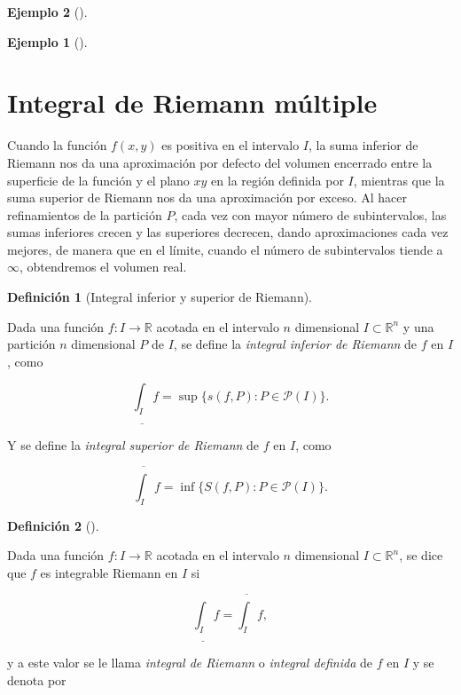 \documentclass[
  a4paper,
]{scrreport}
\theoremstyle{definition}
\newtheorem{example}{Ejemplo}[chapter]
\theoremstyle{plain}
\theoremstyle{definition}
\newtheorem{definition}{Definición}[chapter]
\theoremstyle{definition}
\theoremstyle{plain}
\theoremstyle{plain}
\theoremstyle{remark}
\begin{document}
\begin{example}[]
\begin{example}[]
\end{example}

\section{Integral de Riemann
múltiple}\label{integral-de-riemann-muxfaltiple}

Cuando la función \(f(x,y)\) es positiva en el intervalo \(I\), la suma
inferior de Riemann nos da una aproximación por defecto del volumen
encerrado entre la superficie de la función y el plano \(xy\) en la
región definida por \(I\), mientras que la suma superior de Riemann nos
da una aproximación por exceso. Al hacer refinamientos de la partición
\(P\), cada vez con mayor número de subintervalos, las sumas inferiores
crecen y las superiores decrecen, dando aproximaciones cada vez mejores,
de manera que en el límite, cuando el número de subintervalos tiende a
\(\infty\), obtendremos el volumen real.

\begin{definition}[Integral inferior y superior de
Riemann]\protect\hypertarget{def-integral-inferior-superior-riemann-multiple}{}\label{def-integral-inferior-superior-riemann-multiple}

Dada una función \(f:I\to \mathbb{R}\) acotada en el intervalo \(n\)
dimensional \(I\subset \mathbb{R}^n\) y una partición \(n\) dimensional
\(P\) de \(I\), se define la \emph{integral inferior de Riemann} de
\(f\) en \(I\), como

\[
\underline{\int_I} f = \sup\{s(f,P): P\in\mathcal{P}(I)\}.
\]

Y se define la \emph{integral superior de Riemann} de \(f\) en \(I\),
como

\[
\overline{\int_I} f = \inf\{S(f,P): P\in\mathcal{P}(I)\}.
\]

\end{definition}

\begin{definition}[]\protect\hypertarget{def-integral-riemann-n-dimensional}{}\label{def-integral-riemann-n-dimensional}

Dada una función \(f:I\to \mathbb{R}\) acotada en el intervalo \(n\)
dimensional \(I\subset \mathbb{R}^n\), se dice que \(f\) es integrable
Riemann en \(I\) si

\[
\underline{\int_I} f = \overline{\int_I}f,
\]

y a este valor se le llama \emph{integral de Riemann} o \emph{integral
definida} de \(f\) en \(I\) y se denota por


\end{definition}
\end{example}
\end{document}
